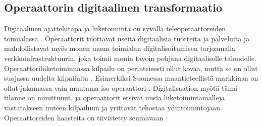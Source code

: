 \documentclass[finnish,12pt,a4paper,pdftex]{article}
\begin{document}

\subsection{Operaattorin digitaalinen transformaatio}

Digitaalinen ajattelutapa ja liiketoiminta on syvällä teleoperaattoreiden toimialassa \citep{mckinseyope}. Operaattorit tuottavat useita digitaalisia tuotteita ja palveluita ja mahdollistavat myös monen muun toimialan digitalisoitumisen tarjoamalla verkkoinfrastruktuurin, joka toimii monin tavoin pohjana digitaaliselle taloudelle. \\

Operaattoriliiketoiminnassa kilpailu on perinteisesti ollut kovaa, mutta se on ollut suojassa uudelta kilpailulta \citep{mckinseytele}. Esimerkiksi Suomessa maantieteellistä markkinaa on ollut jakamassa vain muutama iso operaattori \citep{inderes}. Digitalisaation myötä tämä tilanne on muuttunut, ja operaattorit etsivät uusia liiketoimintamalleja vastatakseen uuteen kilpailuun ja yrittävät tehostaa ydintoimintojaan. Operaattoreiden haasteita on tiivistetty seuraavaan \citep{mckinseyope, inderes}:
\end{document}

